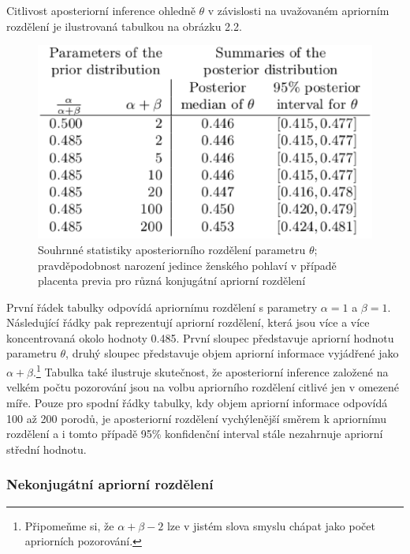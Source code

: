 Citlivost aposteriorní inference ohledně $\theta$ v závislosti na uvažovaném apriorním rozdělení je ilustrovaná tabulkou na obrázku 2.2.

\begin{figure}[htp]
\centering
\includegraphics[scale = 0.50]{pictures/tbl_2_1.eps}
\caption{Souhrnné statistiky aposteriorního rozdělení parametru $\theta$; pravděpodobnost narození jedince ženského pohlaví v případě placenta previa pro různá konjugátní apriorní rozdělení}
\label{tbl_2_1}
\end{figure}

První řádek tabulky odpovídá apriornímu rozdělení s parametry $\alpha = 1$ a $\beta = 1$. Následující řádky pak reprezentují apriorní rozdělení, která jsou více a více koncentrovaná okolo hodnoty 0.485. První sloupec představuje apriorní hodnotu parametru $\theta$, druhý sloupec představuje objem apriorní informace vyjádřené jako $\alpha + \beta$.\footnote{Připomeňme si, že $\alpha + \beta - 2$ lze v jistém slova smyslu chápat jako počet apriorních pozorování.} Tabulka také ilustruje skutečnost, že aposteriorní inference založené na velkém počtu pozorování jsou na volbu apriorního rozdělení citlivé jen v omezené míře. Pouze pro spodní řádky tabulky, kdy objem apriorní informace odpovídá 100 až 200 porodů, je aposteriorní rozdělení vychýlenější směrem k apriornímu rozdělení a i tomto případě 95\% konfidenční interval stále nezahrnuje apriorní střední hodnotu.

\subsubsection{Nekonjugátní apriorní rozdělení}

